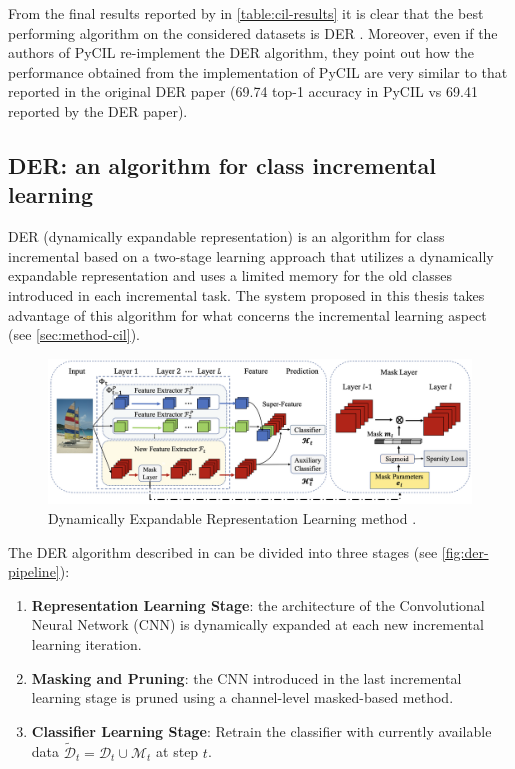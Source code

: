 From the final results reported by \cite{zhou2021pycil} in \autoref{table:cil-results} it is clear that the best performing algorithm on the considered datasets is DER \cite{yan2021dynamically}. Moreover, even if the authors of PyCIL re-implement the DER algorithm, they point out how the performance obtained from the implementation of PyCIL are very similar to that reported in the original DER paper (69.74 top-1 accuracy in PyCIL vs 69.41 reported by the DER paper).


\subsection{DER: an algorithm for class incremental learning}
DER (dynamically expandable representation) is an algorithm for class incremental based on a two-stage learning approach that utilizes a dynamically expandable representation and uses a limited memory for the old classes introduced in each incremental task. The system proposed in this thesis takes advantage of this algorithm for what concerns the incremental learning aspect (see \autoref{sec:method-cil}).


\begin{figure}%
	\centering

    \begin{center}
        \includegraphics[width=\columnwidth]{images/der-pipeline.png}
    \end{center}

	\caption{Dynamically Expandable Representation Learning method \cite{yan2021dynamically}.}%
	\label{fig:der-pipeline}%
\end{figure}


The DER algorithm described in \cite{yan2021dynamically} can be divided into three stages (see \autoref{fig:der-pipeline}):
\begin{enumerate}
    \item \textbf{Representation Learning Stage}: the architecture of the Convolutional Neural Network (CNN) is dynamically expanded at each new incremental learning iteration.
    \item \textbf{Masking and Pruning}: the CNN introduced in the last incremental learning stage is pruned using a channel-level masked-based method.
    \item \textbf{Classifier Learning Stage}: Retrain the classifier with currently available data $\tilde{\mathcal{D}}_t = \mathcal{D}_t \cup \mathcal{M}_t$ at step $t$.
\end{enumerate}


